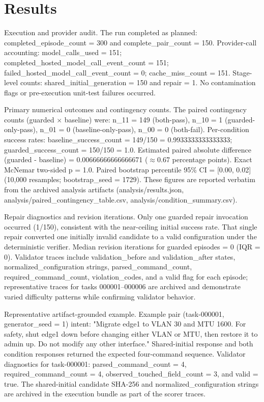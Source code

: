 \documentclass[conference]{IEEEtran}
\begin{document}
\section{Results}
Execution and provider audit. The run completed as planned: completed\_episode\_count = 300 and complete\_pair\_count = 150. Provider-call accounting: model\_calls\_used = 151; completed\_hosted\_model\_call\_event\_count = 151; failed\_hosted\_model\_call\_event\_count = 0; cache\_miss\_count = 151. Stage-level counts: shared\_initial\_generation = 150 and repair = 1. No contamination flags or pre-execution unit-test failures occurred.

Primary numerical outcomes and contingency counts. The paired contingency counts (guarded \ensuremath{\times} baseline) were: n\_11 = 149 (both-pass), n\_10 = 1 (guarded-only-pass), n\_01 = 0 (baseline-only-pass), n\_00 = 0 (both-fail). Per-condition success rates: baseline\_success\_count = 149/150 = 0.9933333333333333; guarded\_success\_count = 150/150 = 1.0. Estimated paired absolute difference (guarded - baseline) = 0.00666666666666671 (\ensuremath{\approx}0.67 percentage points). Exact McNemar two-sided p = 1.0. Paired bootstrap percentile 95\% CI = [0.00, 0.02] (10,000 resamples; bootstrap\_seed = 1729). These figures are reported verbatim from the archived analysis artifacts (analysis/results.json, analysis/paired\_contingency\_table.csv, analysis/condition\_summary.csv).

Repair diagnostics and revision iterations. Only one guarded repair invocation occurred (1/150), consistent with the near-ceiling initial success rate. That single repair converted one initially invalid candidate to a valid configuration under the deterministic verifier. Median revision iterations for guarded episodes = 0 (IQR = 0). Validator traces include validation\_before and validation\_after states, normalized\_configuration strings, parsed\_command\_count, required\_command\_count, violation\_codes, and a valid flag for each episode; representative traces for tasks 000001--000006 are archived and demonstrate varied difficulty patterns while confirming validator behavior.

Representative artifact-grounded example. Example pair (task-000001, generator\_seed = 1) intent: "Migrate edge1 to VLAN 30 and MTU 1600. For safety, shut edge1 down before changing either VLAN or MTU, then restore it to admin up. Do not modify any other interface." Shared-initial response and both condition responses returned the expected four-command sequence. Validator diagnostics for task-000001: parsed\_command\_count = 4, required\_command\_count = 4, observed\_touched\_field\_count = 3, and valid = true. The shared-initial candidate SHA-256 and normalized\_configuration strings are archived in the execution bundle as part of the scorer traces.
\end{document}
